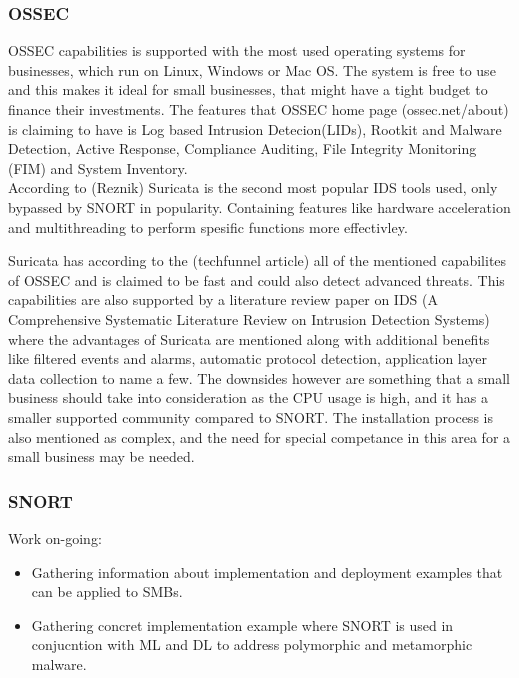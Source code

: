 \subsubsection{OSSEC}

OSSEC capabilities is supported with the most used operating systems for businesses, which run on Linux, Windows or Mac OS. The system is free to use and this makes it ideal for small businesses, that might have a tight budget to finance their investments. The features that OSSEC home page (ossec.net/about) is claiming to have is Log based Intrusion Detecion(LIDs), Rootkit and Malware Detection, Active Response, Compliance Auditing, File Integrity Monitoring (FIM) and System Inventory.\\

According to (Reznik) Suricata is the second most popular IDS tools used, only bypassed by SNORT in popularity. Containing features like hardware acceleration and multithreading to perform spesific functions more effectivley.

Suricata has according to the (techfunnel article) all of the mentioned capabilites of OSSEC and is claimed to be fast and could also detect advanced threats. This capabilities are also supported by a literature review paper on IDS (A Comprehensive Systematic Literature Review on Intrusion Detection Systems) where the advantages of Suricata are mentioned along with additional benefits like filtered events and alarms, automatic protocol detection, application layer data collection to name a few. The downsides however are something that a small business should take into consideration as the CPU usage is high, and it has a smaller supported community compared to SNORT. The installation process is also mentioned as complex, and the need for special competance in this area for a small business may be needed.\\

\subsubsection{SNORT}

\begin{notes}

    Work on-going:

    \begin{itemize}
        \item Gathering information about implementation and deployment examples that can be applied to SMBs.
        \item Gathering concret implementation example where SNORT is used in conjucntion with ML and DL to address polymorphic and metamorphic malware.\\
    \end{itemize}
    
\end{notes}

